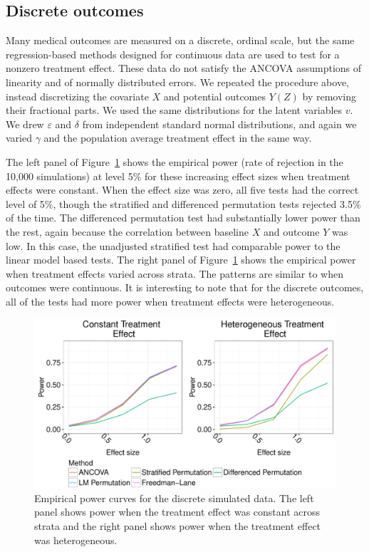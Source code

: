 \documentclass[12pt]{article}
\begin{document}
\subsection{Discrete outcomes}

Many medical outcomes are measured on a discrete, ordinal scale, but the same regression-based methods designed for continuous data are used to test for a nonzero treatment effect.
These data do not satisfy the ANCOVA assumptions of linearity and of normally distributed errors.
We repeated the procedure above, instead discretizing the covariate $X$ and potential outcomes $Y(Z)$ by removing their fractional parts.
We used the same distributions for the latent variables $v$.
We drew $\varepsilon$ and $\delta$ from independent standard normal distributions, and again we varied $\gamma$ and the population average treatment effect in the same way.

The left panel of Figure~\ref{fig:discrete_outcomes_sim_power} shows the empirical power (rate of rejection in the 10,000 simulations) at level 5\% for these increasing effect sizes when treatment effects were constant.
When the effect size was zero, all five tests had the correct level of 5\%, though the stratified and differenced permutation tests rejected 3.5\% of the time.
The differenced permutation test had substantially lower power than the rest,
again because the correlation between baseline $X$ and outcome $Y$ was low.
In this case, the unadjusted stratified test had comparable power to the linear model based tests.
The right panel of Figure~\ref{fig:discrete_outcomes_sim_power} shows the empirical power when treatment effects varied across strata.
The patterns are similar to when outcomes were continuous.
It is interesting to note that for the discrete outcomes, all of the tests had more power when treatment effects were heterogeneous.
\begin{figure}[h]
\centering
\includegraphics[width = \textwidth]{fig/discrete_outcomes_simulation_power.pdf}
\caption{Empirical power curves for the discrete simulated data. The left panel shows power when the treatment effect was constant across strata and the right panel shows power when the treatment effect was heterogeneous.}
\label{fig:discrete_outcomes_sim_power}
\end{figure}
\end{document}
